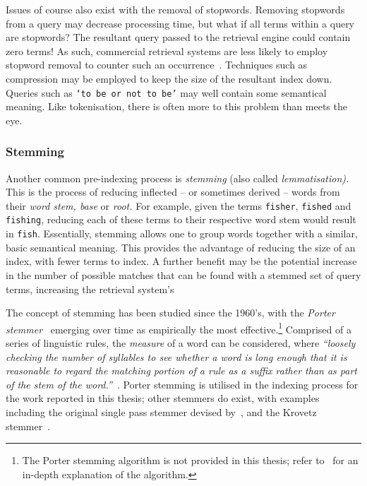 Issues of course also exist with the removal of stopwords. Removing stopwords from a query may decrease processing time, but what if all terms within a query are stopwords? The resultant query passed to the retrieval engine could contain zero terms! As such, commercial retrieval systems are less likely to employ stopword removal to counter such an occurrence~\citep{manning2008ir, dolamic2010stopword}. Techniques such as compression may be employed to keep the size of the resultant index down. Queries such as \texttt{`to be or not to be'} may well contain some semantical meaning. Like tokenisation, there is often more to this problem than meets the eye.

\subsubsection{Stemming}
Another common pre-indexing process is \emph{stemming} (also called \emph{lemmatisation).} This is the process of reducing inflected -- or sometimes derived -- words from their \emph{word stem, base} or \emph{root.} For example, given the terms \texttt{fisher}, \texttt{fished} and \texttt{fishing}, reducing each of these terms to their respective word stem would result in \texttt{fish}. Essentially, stemming allows one to group words together with a similar, basic semantical meaning. This provides the advantage of reducing the size of an index, with fewer terms to index. A further benefit may be the potential increase in the number of possible matches that can be found with a stemmed set of query terms, increasing the retrieval system's 

The concept of stemming has been studied since the 1960's, with the \emph{Porter stemmer}~\citep{porter1980algorithm} emerging over time as empirically the most effective.\footnote{The Porter stemming algorithm is not provided in this thesis; refer to~\cite{porter1980algorithm} for an in-depth explanation of the algorithm.} Comprised of a series of linguistic rules, the \emph{measure} of a word can be considered, where \emph{``loosely checking the number of syllables to see whether a word is long enough that it is reasonable to regard the matching portion of a rule as a suffix rather than as part of the stem of the word.''}~\citep{manning2008ir}. Porter stemming is utilised in the indexing process for the work reported in this thesis; other stemmers do exist, with examples including the original single pass stemmer devised by~\cite{lovins1968development}, and the Krovetz stemmer~\citep{krovetz1993stemming}.

